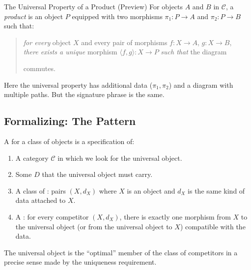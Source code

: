 \begin{example}{The Universal Property of a Product (Preview)}
For objects $A$ and $B$ in $\mathcal{C}$, a \emph{product} is an object $P$
equipped with two morphisms $\pi_1 : P \to A$ and $\pi_2 : P \to B$ such that:
\begin{quote}
  \emph{for every} object $X$ and every pair of morphisms $f : X \to A$,
  $g : X \to B$,\\
  \emph{there exists a unique} morphism $\langle f, g \rangle : X \to P$
  \emph{such that} the diagram
  \medskip
  \begin{center}
  \end{center}
  commutes.
\end{quote}

Here the universal property has additional data ($\pi_1, \pi_2$) and a
diagram with multiple paths. But the signature phrase is the same.
\end{example}

\subsection{Formalizing: The Pattern}

A  for a class of objects is a specification of:
\begin{enumerate}
  \item A category $\mathcal{C}$ in which we look for the universal object.
  \item Some  $D$ that the universal object must carry.
  \item A class of : pairs $(X, d_X)$ where $X$ is an
        object and $d_X$ is the same kind of data attached to $X$.
  \item A : for every competitor $(X, d_X)$,
        there is exactly one morphism from $X$ to the universal object (or
        from the universal object to $X$) compatible with the data.
\end{enumerate}

The universal object is the ``optimal'' member of the class of competitors
in a precise sense made by the uniqueness requirement.

